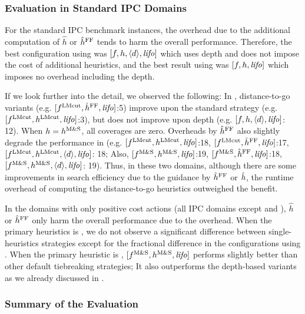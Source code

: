 \subsubsection{Evaluation in Standard IPC Domains}

For the standard IPC benchmark instances, the overhead due to the additional computation of
$\hat{h}$ or $\hat{h}^{\text{FF}}$ tends to harm the overall performance.
Therefore, the best configuration using \lmcut was
$[f,h,{\left<d\right>},{\text{\textit{lifo}}}]$ which uses depth and does not impose the cost of
additional heuristics, and the best result using \mands
was $[f,h,{\text{\textit{lifo}}}]$ which imposes no overhead including the depth.

If we look further into the detail, we observed the following:
In , distance-to-go variants (e.g. $[f^\text{LMcut},\hat{h}^{\text{FF}},{\text{\textit{lifo}}}]$:5) improve upon the standard strategy (e.g. $[f^\text{LMcut},h^\text{LMcut},{\text{\textit{lifo}}}]$:3), but does not improve upon depth (e.g. $[f,h,{\left<d\right>},{\text{\textit{lifo}}}]$: 12). When $h=h^\text{M\&S}$, all coverages are zero. Overheads by $\hat{h}^{\text{FF}}$ also slightly degrade the performance in  (e.g. $[f^\text{LMcut},h^\text{LMcut},{\text{\textit{lifo}}}]$:18, $[f^\text{LMcut},\hat{h}^{\text{FF}},{\text{\textit{lifo}}}]$:17, $[f^\text{LMcut},h^\text{LMcut},{\left<d\right>},{\text{\textit{lifo}}}]$: 18; Also, $[f^\text{M\&S},h^\text{M\&S},{\text{\textit{lifo}}}]$:19, $[f^\text{M\&S},\hat{h}^{\text{FF}},{\text{\textit{lifo}}}]$:18, $[f^\text{M\&S},h^\text{M\&S},{\left<d\right>},{\text{\textit{lifo}}}]$: 19). Thus, in these two domains, although there are some improvements in search efficiency due to the guidance by $\hat{h}^{\text{FF}}$ or $\hat{h}$, the runtime overhead of computing the  distance-to-go heuristics outweighed the benefit.
 
In the domains with only positive cost actions (all IPC domains except  and ), $\hat{h}$ or $\hat{h}^{\text{FF}}$
only harm the overall performance due to the overhead.
When the primary heuristics is \lmcut, we do not observe a significant difference between single-heuristics strategies except for the fractional difference in the configurations using \ro.
When the primary heuristic is  \mands, $[f^\text{M\&S},h^\text{M\&S},{\text{\textit{lifo}}}]$ performs slightly better than  other default tiebreaking strategies; It also outperforms the depth-based variants as we already discussed in .

\subsubsection{Summary of the Evaluation}

